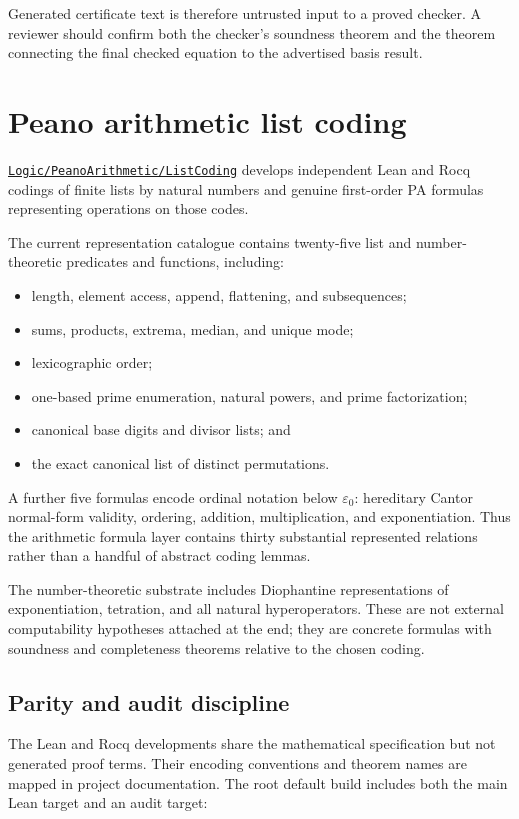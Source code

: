 \documentclass[
  10pt,
  a4paper,
  twoside,
  open=any,
  parskip=half,
  headings=big
]{scrreprt}
\newcommand{\CommitFull}{56a402bf82a9aab119fcbe3e96b991d387b221c5}
\newcommand{\RepoWeb}{https://github.com/VladimirReshetnikov/ProveIt}
\newcommand{\RepoTreeBase}{\RepoWeb/tree/\CommitFull}
\newcommand{\RepoDir}[1]{\href{\RepoTreeBase/#1}{\nolinkurl{#1}}}
\begin{document}
Generated certificate text is therefore untrusted input to a proved checker. A reviewer should confirm both the checker's soundness theorem and the theorem connecting the final checked equation to the advertised basis result.

\section{Peano arithmetic list coding}
\label{sec:pa-list-coding}

\RepoDir{Logic/PeanoArithmetic/ListCoding} develops independent Lean and Rocq codings of finite lists by natural numbers and genuine first-order PA formulas representing operations on those codes.

The current representation catalogue contains twenty-five list and number-theoretic predicates and functions, including:

\begin{itemize}
  \item length, element access, append, flattening, and subsequences;
  \item sums, products, extrema, median, and unique mode;
  \item lexicographic order;
  \item one-based prime enumeration, natural powers, and prime factorization;
  \item canonical base digits and divisor lists; and
  \item the exact canonical list of distinct permutations.
\end{itemize}

A further five formulas encode ordinal notation below $\varepsilon_0$: hereditary Cantor normal-form validity, ordering, addition, multiplication, and exponentiation. Thus the arithmetic formula layer contains thirty substantial represented relations rather than a handful of abstract coding lemmas.

The number-theoretic substrate includes Diophantine representations of exponentiation, tetration, and all natural hyperoperators. These are not external computability hypotheses attached at the end; they are concrete formulas with soundness and completeness theorems relative to the chosen coding.

\subsection{Parity and audit discipline}

The Lean and Rocq developments share the mathematical specification but not generated proof terms. Their encoding conventions and theorem names are mapped in project documentation. The root default build includes both the main Lean target and an audit target:
\end{document}
